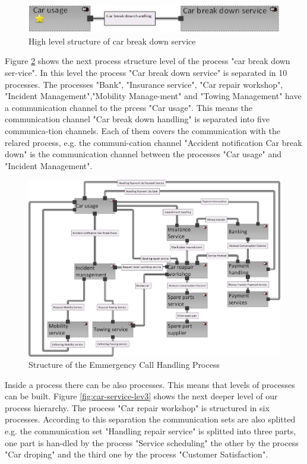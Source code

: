 \begin{figure}[ph]
	\centering
	\includegraphics[width=0.7\linewidth]{Figures/Chapter5/figures-hierarchy/Car-Service-Level1.jpg}
	\caption[High level structure of car break down service]{High level structure of car break down service}
	\label{fig:car-service-level1}
\end{figure}



Figure \ref{fig:car-service-leve2} shows the next process structure level of the process "car break down ser-vice". In this level the process "Car break down service" is separated in 10 processes. The processes "Bank", "Insurance service", "Car repair workshop", "Incident Management","Mobility Manage-ment" and "Towing Management" have a communication channel to the prcess "Car usage". This means the communication channel "Car break down handling" is separated into five communica-tion channels. Each of them covers the communication with the relared process, e.g. the communi-cation channel "Accident notification Car break down" is the communication channel between the processes "Car usage" and "Incident Management".\\


\begin{figure}
	\centering
	\includegraphics[width=0.8\linewidth]{Figures/Chapter5/figures-hierarchy/Car-Service-Leve2}
	\caption[Structure of the Emmergency Call Handling Process]{Structure of the Emmergency Call Handling Process}
	\label{fig:car-service-leve2}
\end{figure}



Inside a process there can be also processes. This means that levels of processes can be built. Figure \ref{fig:car-service-lev3} shows the next deeper level of our process hierarchy. The process "Car repair workshop" is structured in six processes. According to this separation the communication sets are also splitted e.g. the communication set "Handling repair service" is splitted into three parts, one part is han-dled by the process "Service scheduling" the other by the process "Car droping" and the third one by the process "Customer Satisfaction".\\

